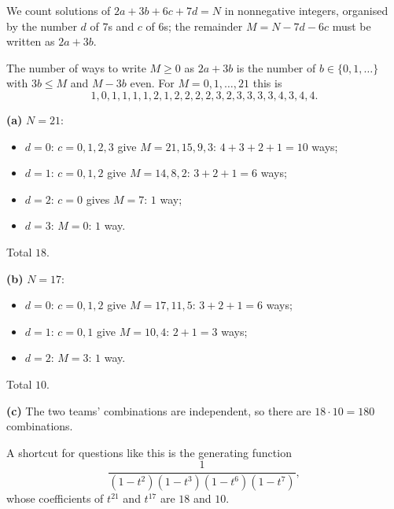 We count solutions of $2a+3b+6c+7d=N$ in nonnegative integers, organised by the number $d$ of $7$s and $c$ of $6$s; the remainder $M=N-7d-6c$ must be written as $2a+3b$.

The number of ways to write $M\ge0$ as $2a+3b$ is the number of $b\in\{0,1,\dots\}$ with $3b\le M$ and $M-3b$ even. For $M=0,1,\dots,21$ this is
\[1,0,1,1,1,1,2,1,2,2,2,2,3,2,3,3,3,3,4,3,4,4.\]

\textbf{(a)} $N=21$:
\begin{itemize}
\item $d=0$: $c=0,1,2,3$ give $M=21,15,9,3$: $4+3+2+1=10$ ways;
\item $d=1$: $c=0,1,2$ give $M=14,8,2$: $3+2+1=6$ ways;
\item $d=2$: $c=0$ gives $M=7$: $1$ way;
\item $d=3$: $M=0$: $1$ way.
\end{itemize}
Total $\boxed{18}$.

\textbf{(b)} $N=17$:
\begin{itemize}
\item $d=0$: $c=0,1,2$ give $M=17,11,5$: $3+2+1=6$ ways;
\item $d=1$: $c=0,1$ give $M=10,4$: $2+1=3$ ways;
\item $d=2$: $M=3$: $1$ way.
\end{itemize}
Total $\boxed{10}$.

\textbf{(c)} The two teams' combinations are independent, so there are $18\cdot10=\boxed{180}$ combinations.

A shortcut for questions like this is the generating function
\[\dfrac{1}{(1-t^2)(1-t^3)(1-t^6)(1-t^7)},\]
whose coefficients of $t^{21}$ and $t^{17}$ are $18$ and $10$.
